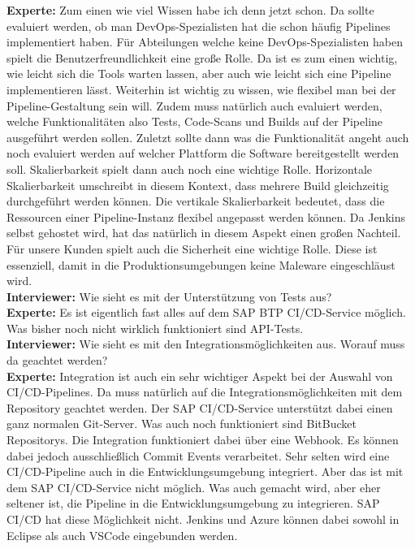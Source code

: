 \begin{linenumbers}
\textbf{Experte:} Zum einen wie viel Wissen habe ich denn jetzt schon. Da sollte evaluiert werden, ob man DevOps-Spezialisten hat die schon häufig Pipelines implementiert haben. Für Abteilungen welche keine DevOps-Spezialisten haben spielt die Benutzerfreundlichkeit eine große Rolle. Da ist es zum einen wichtig, wie leicht sich die Tools warten lassen, aber auch wie leicht sich eine Pipeline implementieren lässt. Weiterhin ist wichtig zu wissen, wie flexibel man bei der Pipeline-Gestaltung sein will. Zudem muss natürlich auch evaluiert werden, welche Funktionalitäten also Tests, Code-Scans und Builds auf der Pipeline ausgeführt werden sollen. Zuletzt sollte dann was die Funktionalität angeht auch noch evaluiert werden auf welcher Plattform die Software bereitgestellt werden soll. Skalierbarkeit spielt dann auch noch eine wichtige Rolle. Horizontale Skalierbarkeit umschreibt in diesem Kontext, dass mehrere Build gleichzeitig durchgeführt werden können. Die vertikale Skalierbarkeit bedeutet, dass die Ressourcen einer Pipeline-Instanz flexibel angepasst werden können. Da Jenkins selbst gehostet wird, hat das natürlich in diesem Aspekt einen großen Nachteil. Für unsere Kunden spielt auch die Sicherheit eine wichtige Rolle. Diese ist essenziell, damit in die Produktionsumgebungen keine Maleware eingeschläust wird.\\ 
\textbf{Interviewer:} Wie sieht es mit der Unterstützung von Tests aus?\\
\textbf{Experte:} Es ist eigentlich fast alles auf dem SAP BTP CI/CD-Service möglich. Was bisher noch nicht wirklich funktioniert sind API-Tests.\\
\textbf{Interviewer:} Wie sieht es mit den Integrationsmöglichkeiten aus. Worauf muss da geachtet werden?\\
\textbf{Experte:} Integration ist auch ein sehr wichtiger Aspekt bei der Auswahl von CI/CD-Pipelines. Da muss natürlich auf die Integrationsmöglichkeiten mit dem Repository geachtet werden. Der SAP CI/CD-Service unterstützt dabei einen ganz normalen Git-Server. Was auch noch funktioniert sind BitBucket Repositorys. Die Integration funktioniert dabei über eine Webhook. Es können dabei jedoch ausschließlich Commit Events verarbeitet. Sehr selten wird eine CI/CD-Pipeline auch in die Entwicklungsumgebung integriert. Aber das ist mit dem SAP CI/CD-Service nicht möglich. Was auch gemacht wird, aber eher seltener ist, die Pipeline in die Entwicklungsumgebung zu integrieren. SAP CI/CD hat diese Möglichkeit nicht. Jenkins und Azure können dabei sowohl in Eclipse als auch VSCode eingebunden werden.\\

\end{linenumbers}
